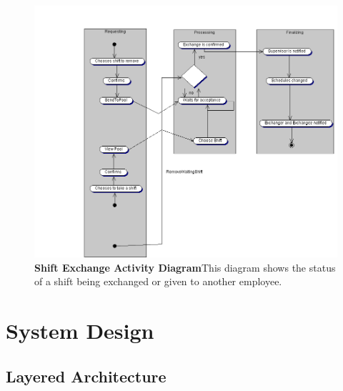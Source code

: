 \documentclass[letterpaper,12pt]{report}
\begin{document}
\begin{figure}[activity_exchangeshifts]
 \centering
 \includegraphics[scale=0.79,trim=40mm 0mm 0mm 0mm]{diagrams/actRequestShiftChange.png}
 \caption{\small
\textbf{Shift Exchange Activity Diagram}\newline This diagram shows the status of a shift being exchanged or given to another employee. }\label{fig:actRequestShiftChange}
\end{figure}
\newpage

\part{System Design}
\chapter{Layered Architecture}
\end{document}
